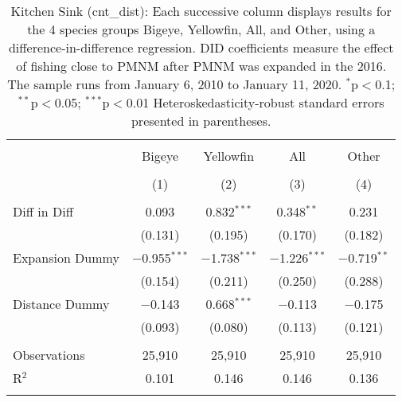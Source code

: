 
\begin{table}[!htbp] \centering 
  \caption{Kitchen Sink (cnt_dist): Each successive column displays results for the 4 species groups Bigeye, Yellowfin, All, and Other, using a difference-in-difference regression. DID coefficients measure the effect of fishing close to PMNM after PMNM was expanded in the 2016. The sample runs from January 6, 2010 to January 11, 2020. $^{*}$p$<$0.1; $^{**}$p$<$0.05; $^{***}$p$<$0.01 Heteroskedasticity-robust standard errors presented in parentheses.} 
  \label{tbl:kitchenFEcnt_dist} 
\begin{tabular}{@{\extracolsep{5pt}}lcccc} 
\\[-1.8ex]\hline 
\hline \\[-1.8ex] 
 & Bigeye & Yellowfin & All & Other \\ 
\\[-1.8ex] & (1) & (2) & (3) & (4)\\ 
\hline \\[-1.8ex] 
 Diff in Diff & 0.093 & 0.832$^{***}$ & 0.348$^{**}$ & 0.231 \\ 
  & (0.131) & (0.195) & (0.170) & (0.182) \\ 
  Expansion Dummy & $-$0.955$^{***}$ & $-$1.738$^{***}$ & $-$1.226$^{***}$ & $-$0.719$^{**}$ \\ 
  & (0.154) & (0.211) & (0.250) & (0.288) \\ 
  Distance Dummy & $-$0.143 & 0.668$^{***}$ & $-$0.113 & $-$0.175 \\ 
  & (0.093) & (0.080) & (0.113) & (0.121) \\ 
 \hline \\[-1.8ex] 
Observations & 25,910 & 25,910 & 25,910 & 25,910 \\ 
R$^{2}$ & 0.101 & 0.146 & 0.146 & 0.136 \\ 
\hline 
\hline \\[-1.8ex] 
\end{tabular} 
\end{table} 
